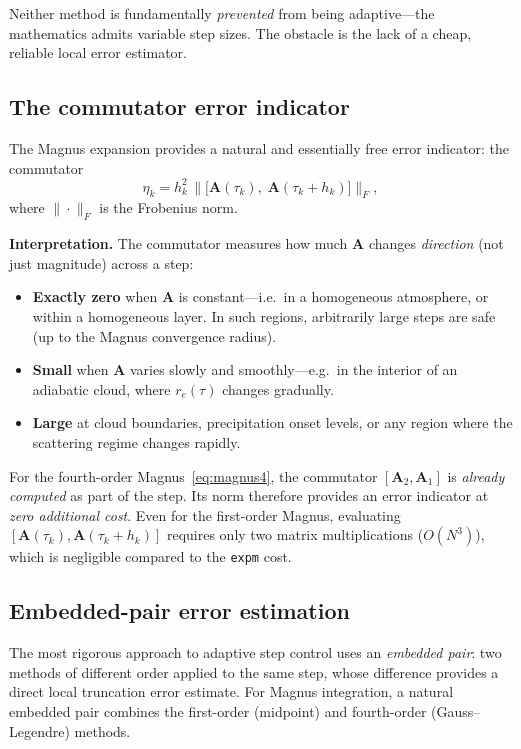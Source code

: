 \documentclass[11pt,a4paper]{article}
\newcommand{\mat}[1]{\mathbf{#1}}
\theoremstyle{definition}
\begin{document}
Neither method is fundamentally \emph{prevented} from being
adaptive---the mathematics admits variable step sizes.  The obstacle is
the lack of a cheap, reliable local error estimator.

\subsection{The commutator error indicator}\label{sec:commutator}

The Magnus expansion provides a natural and essentially free error
indicator: the commutator
\begin{equation}\label{eq:commutator_indicator}
  \eta_k = h_k^2\,\bigl\|\bigl[\mat{A}(\tau_k),\;\mat{A}(\tau_k+h_k)\bigr]\bigr\|_F,
\end{equation}
where $\|\cdot\|_F$ is the Frobenius norm.

\textbf{Interpretation.}  The commutator measures how much $\mat{A}$
changes \emph{direction} (not just magnitude) across a step:
\begin{itemize}[nosep]
\item \textbf{Exactly zero} when $\mat{A}$ is constant---i.e.\ in a
  homogeneous atmosphere, or within a homogeneous layer.  In such
  regions, arbitrarily large steps are safe (up to the Magnus
  convergence radius).
\item \textbf{Small} when $\mat{A}$ varies slowly and smoothly---e.g.\
  in the interior of an adiabatic cloud, where $r_e(\tau)$ changes
  gradually.
\item \textbf{Large} at cloud boundaries, precipitation onset levels,
  or any region where the scattering regime changes rapidly.
\end{itemize}

For the fourth-order Magnus~\eqref{eq:magnus4}, the commutator
$[\mat{A}_2,\mat{A}_1]$ is \emph{already computed} as part of the
step.  Its norm therefore provides an error indicator at
\emph{zero additional cost}.  Even for the first-order Magnus, evaluating
$[\mat{A}(\tau_k),\mat{A}(\tau_k+h_k)]$ requires only two matrix
multiplications ($O(N^3)$), which is negligible compared to the
\texttt{expm} cost.

\subsection{Embedded-pair error estimation}\label{sec:embedded_pair}

The most rigorous approach to adaptive step control uses an
\emph{embedded pair}: two methods of different order applied to the same
step, whose difference provides a direct local truncation error
estimate.  For Magnus integration, a natural embedded pair combines the
first-order (midpoint) and fourth-order (Gauss--Legendre) methods.
\end{document}
